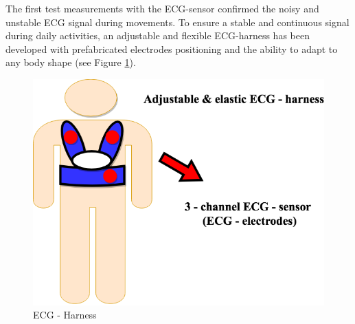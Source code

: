 \documentclass[review]{elsarticle}
\begin{document}
The first test measurements with the ECG-sensor confirmed the noisy and unstable ECG signal during movements. To ensure a stable and continuous signal during daily activities, an adjustable and flexible ECG-harness has been developed with prefabricated electrodes positioning and the ability to adapt to any body shape (see Figure \ref{fig:ECGHarness}).
\begin{figure}[!ht]
	\centering
	\includegraphics[scale=0.32]{Images/ECG-Harness.png}
	\caption[ECG - Harness]{ECG - Harness}
	\label{fig:ECGHarness}
\end{figure}
\end{document}

